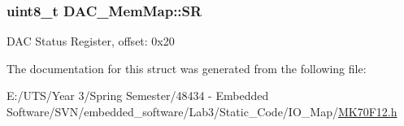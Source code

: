 \subsubsection[{S\+R}]{\setlength{\rightskip}{0pt plus 5cm}uint8\+\_\+t D\+A\+C\+\_\+\+Mem\+Map\+::\+S\+R}\label{struct_d_a_c___mem_map_a146115dd60e5e34ce6f1d8dc2b860877}
D\+A\+C Status Register, offset\+: 0x20 

The documentation for this struct was generated from the following file\+:\begin{DoxyCompactItemize}
\item 
E\+:/\+U\+T\+S/\+Year 3/\+Spring Semester/48434 -\/ Embedded Software/\+S\+V\+N/embedded\+\_\+software/\+Lab3/\+Static\+\_\+\+Code/\+I\+O\+\_\+\+Map/\hyperlink{_m_k70_f12_8h}{M\+K70\+F12.\+h}\end{DoxyCompactItemize}
